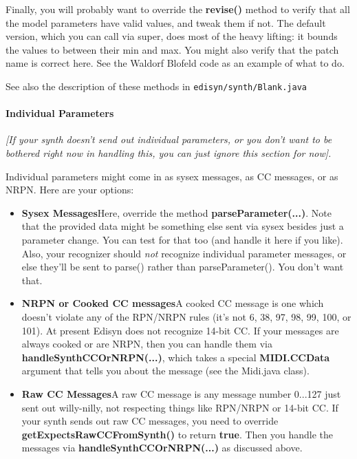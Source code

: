 \documentclass{article}
\begin{document}
Finally, you will probably want to override the {\bf revise()} method to verify that all the model parameters have valid values, and tweak them if not.  The default version, which you can call via super, does most of the heavy lifting: it bounds the values to between their min and max.  You might also verify that the patch name is correct here.  See the Waldorf Blofeld code as an example of what to do.

See also the description of these methods in {\tt edisyn/synth/Blank.java}

\paragraph{Individual Parameters}

{\it [If your synth doesn't send out individual parameters, or you don't want to be bothered right now in handling this, you can just ignore this section for now].}

Individual parameters might come in as sysex messages, as CC messages, or as NRPN.  Here are your options:

\begin{itemize}
\item {\bf Sysex Messages}\quad Here, override the method {\bf parseParameter(...)}.  Note that the provided data might be something else sent via sysex besides just a parameter change.  You can test for that too (and handle it here if you like).  Also, your recognizer should {\it not} recognize individual parameter messages, or else they'll be sent to parse() rather than parseParameter().  You don't want that.

\item {\bf NRPN or Cooked CC messages}\quad A cooked CC message is one which doesn't violate any of the RPN/NRPN rules (it's not 6, 38, 97, 98, 99, 100, or 101).  At present Edisyn does not recognize 14-bit CC.  If your messages are always cooked or are NRPN, then you can handle them via {\bf handleSynthCCOrNRPN(...)}, which takes a special {\bf MIDI.CCData} argument that tells you about the message (see the Midi.java class). 

\item {\bf Raw CC Messages}\quad A raw CC message is any message number 0...127 just sent out willy-nilly, not respecting things like RPN/NRPN or 14-bit CC.  If your synth sends out raw CC messages, you need to override {\bf getExpectsRawCCFromSynth()} to return {\bf true}.  Then you handle the messages via  {\bf handleSynthCCOrNRPN(...)} as discussed above.
\end{itemize}
\end{document}
